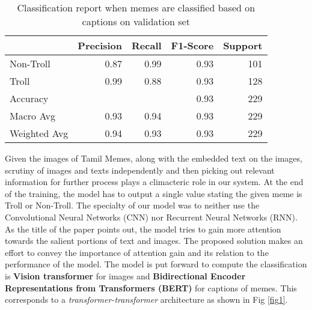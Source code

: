 \documentclass[11pt,a4paper]{article}
\begin{document}
\begin{table*}[!h]
\begin{center}
\renewcommand{\tabcolsep}{3mm}
\begin{tabular}{l|r|r|r|r}
\hline
 & Precision & Recall & F1-Score & Support\\
\hline
Non-Troll & 0.87 & 0.99 & 0.93 & 101\\
Troll & 0.99 & 0.88 & 0.93 & 128\\ 
\hline
Accuracy & & & 0.93 & 229\\
Macro Avg & 0.93 & 0.94 & 0.93 & 229 \\
Weighted Avg & 0.94 & 0.93 & 0.93 & 229\\
\hline
\end{tabular}
\end{center}
\caption{Classification report when memes are classified based on captions on validation set}\label{tab3}
\end{table*}

Given the images of Tamil Memes, along with the embedded text on the images, scrutiny of images and texts independently and then picking out relevant information for further process plays a climacteric role in our system. At the end of the training, the model has to output a single value stating the given meme is Troll or Non-Troll. The specialty of our model was to neither use the Convolutional Neural Networks (CNN) nor Recurrent Neural Networks (RNN). As the title of the paper points out, the model tries to gain more attention towards the salient portions of text and images. The proposed solution makes an effort to convey the importance of attention gain and its relation to the performance of the model. The model is put forward to compute the classification is \textbf{Vision transformer} \cite{dosovitskiy2021an} for images and \textbf{Bidirectional Encoder Representations from Transformers (BERT)} \cite{devlin-etal-2019-bert} for captions of memes. This corresponds to a \emph{transformer-transformer} architecture as shown in Fig \ref{fig1}. 
 
 
\end{document}
